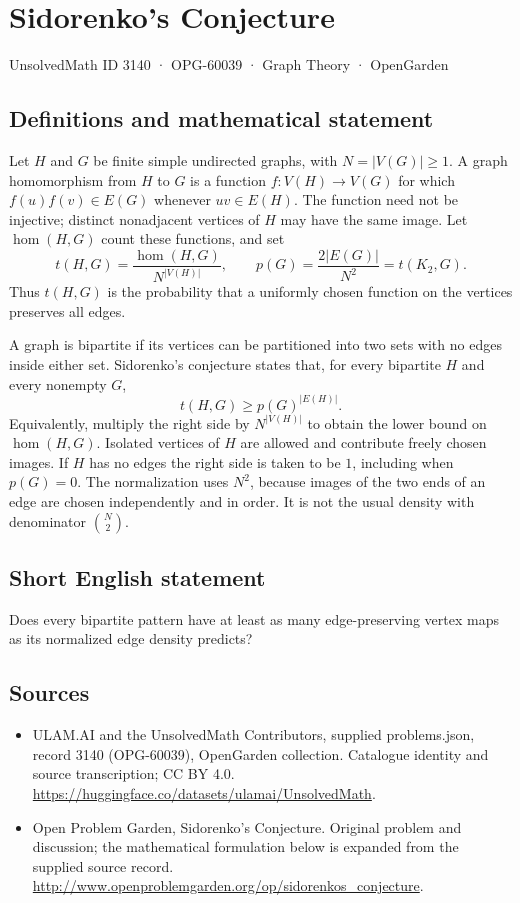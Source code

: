 \documentclass[11pt,a4paper]{article}
\begin{document}
\section*{Sidorenko's Conjecture}\label{3140}
{\small UnsolvedMath ID 3140 · OPG-60039 · Graph Theory · OpenGarden}
\subsection{Definitions and mathematical statement}
Let $H$ and $G$ be finite simple undirected graphs, with
$N=|V(G)|\geq1$. A graph homomorphism from $H$ to $G$ is a function
$f:V(H)\to V(G)$ for which $f(u)f(v)\in E(G)$ whenever
$uv\in E(H)$. The function need not be injective; distinct
nonadjacent vertices of $H$ may have the same image. Let
$\operatorname{hom}(H,G)$ count these functions, and set
\[
 t(H,G)=\frac{\operatorname{hom}(H,G)}{N^{|V(H)|}},
 \qquad p(G)=\frac{2|E(G)|}{N^2}=t(K_2,G).
\]
Thus $t(H,G)$ is the probability that a uniformly chosen function
on the vertices preserves all edges.

A graph is bipartite if its vertices can be partitioned into two
sets with no edges inside either set. Sidorenko's conjecture states
that, for every bipartite $H$ and every nonempty $G$,
\[
 t(H,G)\geq p(G)^{|E(H)|}.
\]
Equivalently, multiply the right side by $N^{|V(H)|}$ to obtain
the lower bound on $\operatorname{hom}(H,G)$. Isolated vertices of
$H$ are allowed and contribute freely chosen images. If $H$ has
no edges the right side is taken to be $1$, including when $p(G)=0$.
The normalization uses $N^2$, because images of the two ends of
an edge are chosen independently and in order. It is not the usual
density with denominator $\binom N2$.
\subsection{Short English statement}
Does every bipartite pattern have at least as many edge-preserving vertex maps as its normalized edge density predicts?
\subsection{Sources}
\begin{itemize}
\item[S1] ULAM.AI and the UnsolvedMath Contributors, supplied problems.json, record 3140 (OPG-60039), OpenGarden collection. Catalogue identity and source transcription; CC BY 4.0.
\url{https://huggingface.co/datasets/ulamai/UnsolvedMath}.
\item[S2] Open Problem Garden, Sidorenko's Conjecture. Original problem and discussion; the mathematical formulation below is expanded from the supplied source record.
\url{http://www.openproblemgarden.org/op/sidorenkos_conjecture}.
\end{itemize}
\end{document}
